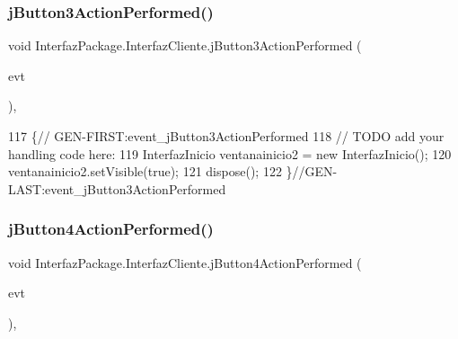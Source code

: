 \subsubsection{\texorpdfstring{j\+Button3\+Action\+Performed()}{jButton3ActionPerformed()}}
{\footnotesize\ttfamily void Interfaz\+Package.\+Interfaz\+Cliente.\+j\+Button3\+Action\+Performed (\begin{DoxyParamCaption}\item[{java.\+awt.\+event.\+Action\+Event}]{evt }\end{DoxyParamCaption})\hspace{0.3cm}{\ttfamily [inline]}, {\ttfamily [private]}}


\begin{DoxyCode}
117                                                                          \{\textcolor{comment}{//
      GEN-FIRST:event\_jButton3ActionPerformed}
118         \textcolor{comment}{// TODO add your handling code here:}
119         InterfazInicio ventanainicio2 = \textcolor{keyword}{new} InterfazInicio();
120         ventanainicio2.setVisible(\textcolor{keyword}{true});
121         dispose();
122     \}\textcolor{comment}{//GEN-LAST:event\_jButton3ActionPerformed}
\end{DoxyCode}
\mbox{\label{class_interfaz_package_1_1_interfaz_cliente_a2d52e60b1ae90075685a12355727cefd}} 
\subsubsection{\texorpdfstring{j\+Button4\+Action\+Performed()}{jButton4ActionPerformed()}}
{\footnotesize\ttfamily void Interfaz\+Package.\+Interfaz\+Cliente.\+j\+Button4\+Action\+Performed (\begin{DoxyParamCaption}\item[{java.\+awt.\+event.\+Action\+Event}]{evt }\end{DoxyParamCaption})\hspace{0.3cm}{\ttfamily [inline]}, {\ttfamily [private]}}


